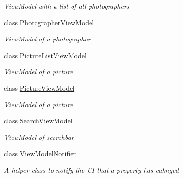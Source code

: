 \begin{DoxyCompactItemize}
\begin{DoxyCompactList}\small\item\em View\+Model with a list of all photographers \end{DoxyCompactList}\item 
class \mbox{\hyperlink{class_pic_d_b_1_1_view_models_1_1_photographer_view_model}{Photographer\+View\+Model}}
\begin{DoxyCompactList}\small\item\em View\+Model of a photographer \end{DoxyCompactList}\item 
class \mbox{\hyperlink{class_pic_d_b_1_1_view_models_1_1_picture_list_view_model}{Picture\+List\+View\+Model}}
\begin{DoxyCompactList}\small\item\em View\+Model of a picture \end{DoxyCompactList}\item 
class \mbox{\hyperlink{class_pic_d_b_1_1_view_models_1_1_picture_view_model}{Picture\+View\+Model}}
\begin{DoxyCompactList}\small\item\em View\+Model of a picture \end{DoxyCompactList}\item 
class \mbox{\hyperlink{class_pic_d_b_1_1_view_models_1_1_search_view_model}{Search\+View\+Model}}
\begin{DoxyCompactList}\small\item\em View\+Model of searchbar \end{DoxyCompactList}\item 
class \mbox{\hyperlink{class_pic_d_b_1_1_view_models_1_1_view_model_notifier}{View\+Model\+Notifier}}
\begin{DoxyCompactList}\small\item\em A helper class to notify the UI that a property has cahnged \end{DoxyCompactList}\end{DoxyCompactItemize}
